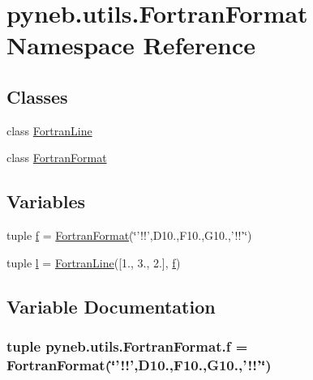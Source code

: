 \hypertarget{namespacepyneb_1_1utils_1_1_fortran_format}{\section{pyneb.\-utils.\-Fortran\-Format Namespace Reference}
\label{namespacepyneb_1_1utils_1_1_fortran_format}
}
\subsection*{Classes}
\begin{DoxyCompactItemize}
\item 
class \hyperlink{classpyneb_1_1utils_1_1_fortran_format_1_1_fortran_line}{Fortran\-Line}
\item 
class \hyperlink{classpyneb_1_1utils_1_1_fortran_format_1_1_fortran_format}{Fortran\-Format}
\end{DoxyCompactItemize}
\subsection*{Variables}
\begin{DoxyCompactItemize}
\item 
tuple \hyperlink{namespacepyneb_1_1utils_1_1_fortran_format_af94352584eced016c14d524330879115}{f} = \hyperlink{classpyneb_1_1utils_1_1_fortran_format_1_1_fortran_format}{Fortran\-Format}(\char`\"{}'!!',D10.,F10.,G10.,'!!'\char`\"{})
\item 
tuple \hyperlink{namespacepyneb_1_1utils_1_1_fortran_format_a80ea829e31363f67a89c70955e194b93}{l} = \hyperlink{classpyneb_1_1utils_1_1_fortran_format_1_1_fortran_line}{Fortran\-Line}(\mbox{[}1., 3., 2.\mbox{]}, \hyperlink{namespacepyneb_1_1utils_1_1_fortran_format_af94352584eced016c14d524330879115}{f})
\end{DoxyCompactItemize}


\subsection{Variable Documentation}
\hypertarget{namespacepyneb_1_1utils_1_1_fortran_format_af94352584eced016c14d524330879115}{
\subsubsection[{f}]{\setlength{\rightskip}{0pt plus 5cm}tuple pyneb.\-utils.\-Fortran\-Format.\-f = {\bf Fortran\-Format}(\char`\"{}'!!',D10.,F10.,G10.,'!!'\char`\"{})}}\label{namespacepyneb_1_1utils_1_1_fortran_format_af94352584eced016c14d524330879115}


